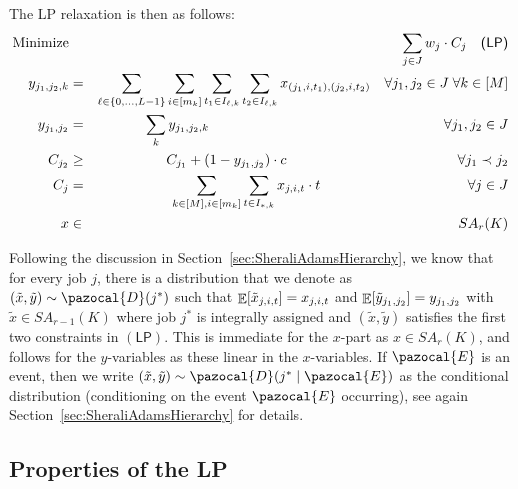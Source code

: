   
  The LP relaxation is then as follows: 
  \begin{eqnarray*}
    \textrm{Minimize} & & \sum_{j \in J} w_j \cdot C_j  \quad \textsf{(LP)} \\
    y_{j_1,j_2,k} &=& \sum_{\ell \in \{ 0,\ldots,L-1\}}  \sum_{i \in [m_k]} \sum_{t_1 \in I_{\ell,k}} \sum_{t_2 \in I_{\ell,k}} x_{(j_1,i,t_1),(j_2,i,t_2)} \quad \forall j_1,j_2 \in J\; \forall k \in [M] \\
    y_{j_1,j_2} &=& \sum_{k}  y_{j_1,j_2,k}  \hspace{5.9cm} \forall j_1,j_2 \in J\\
    C_{j_2} &\geq& C_{j_1} + (1-y_{j_1,j_2}) \cdot c \hspace{4.3cm} \forall j_1 \prec j_2 \\
    C_j &=&  \sum_{k \in [M], i \in [m_k]} \sum_{t \in I_{*,k}} x_{j,i,t} \cdot t \hspace{3.7cm} \forall j \in J \\ 
    x &\in& SA_r(K)
  \end{eqnarray*}
  
  Following the discussion in Section~\ref{sec:SheraliAdamsHierarchy}, we know that for every job $j$, there is a
  distribution that we denote as $(\tilde{x},\tilde{y}) \sim \pazocal{D}(j^*)$ such that $\mathop{\mathbb{E}}[\tilde{x}_{j,i,t}] = x_{j,i,t}$
  and $\mathop{\mathbb{E}}[\tilde{y}_{j_1,j_2}] = y_{j_1,j_2}$ with $\tilde{x} \in SA_{r-1}(K)$ where job $j^*$ is integrally assigned and $(\tilde{x},\tilde{y})$ satisfies the first two constraints in $(\mathsf{LP})$.
  This is immediate for the $x$-part as $x \in SA_r(K)$, and follows for the $y$-variables as these  
  linear in the $x$-variables. 
  If $\pazocal{E}$ is an event, then we write $(\tilde{x},\tilde{y}) \sim \pazocal{D}(j^* \mid \pazocal{E})$ as the conditional distribution (conditioning on the event $\pazocal{E}$ occurring), see again Section~\ref{sec:SheraliAdamsHierarchy} for details.
  
  
  
  
  \subsection{Properties of the LP}
  \label{sec:LP-properties}
  

